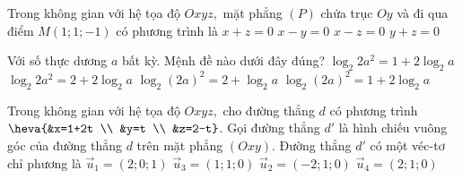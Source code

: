 \begin{ex}%
	Trong không gian với hệ tọa độ $Oxyz,$ mặt phẳng $(P)$ chứa trục $Oy$ và đi qua điểm $M(1;1;-1)$ có phương trình là
	\choice
	{\True $x+z=0$}
	{$x-y=0$}
	{$x-z=0$}
	{$y+z=0$}
\end{ex}

\begin{ex}%
	Với số thực dương $a$ bất kỳ. Mệnh đề nào dưới đây đúng?
	\choice
	{\True $\log_2{2a^2}=1+2\log_2{a}$}
	{$\log_2{2a^2}=2+2\log_2{a}$}
	{$\log_2(2a)^2=2+\log_2{a}$}
	{$\log_2(2a)^2=1+2\log_2{a}$}
\end{ex}

\begin{ex}%
	Trong không gian với hệ tọa độ $Oxyz,$ cho đường thẳng $d$ có phương trình $\heva{&x=1+2t \\ &y=t \\ &z=2-t}$. Gọi đường thẳng $d'$ là hình chiếu vuông góc của đường thẳng $d$ trên mặt phẳng $(Oxy)$. Đường thẳng $d'$ có một véc-tơ chỉ phương là
	\choice
	{$\overrightarrow{u}_1=(2;0;1)$}
	{$\overrightarrow{u}_3=(1;1;0)$}
	{$\overrightarrow{u}_2=(-2;1;0)$}
	{\True $\overrightarrow{u}_4=(2;1;0)$}
\end{ex}

